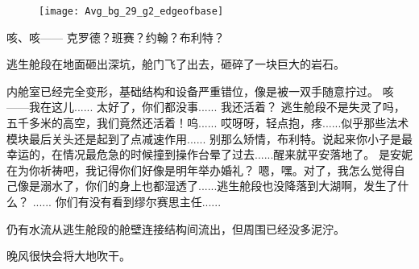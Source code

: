 \documentclass[openany]{book}
\begin{document}
\begin{figure}[h]
    \centering
    \texttt{[image: Avg\_bg\_29\_g2\_edgeofbase]}
\end{figure}
\begin{dialogue}
     咳、咳——
     克罗德？班赛？约翰？布利特？\par
    逃生舱段在地面砸出深坑，舱门飞了出去，砸碎了一块巨大的岩石。\par
    内舱室已经完全变形，基础结构和设备严重错位，像是被一双手随意拧过。
     咳——我在这儿......
     太好了，你们都没事......
     我还活着？
     逃生舱段不是失灵了吗，五千多米的高空，我们竟然还活着！呜......
     哎呀呀，轻点抱，疼......似乎那些法术模块最后关头还是起到了点减速作用......
     别那么矫情，布利特。说起来你小子是最幸运的，在情况最危急的时候撞到操作台晕了过去......醒来就平安落地了。
     是安妮在为你祈祷吧，我记得你们好像是明年举办婚礼？
     嗯，嘿。对了，我怎么觉得自己像是溺水了，你们的身上也都湿透了......逃生舱段也没降落到大湖啊，发生了什么？
     ......
     你们有没有看到缪尔赛思主任......
\end{dialogue}\par

仍有水流从逃生舱段的舱壁连接结构间流出，但周围已经没多泥泞。\par
晚风很快会将大地吹干。
\end{document}
